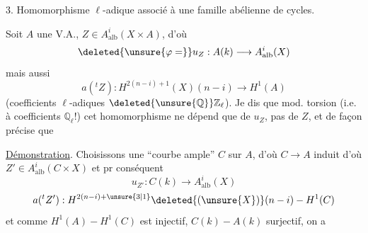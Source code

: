 3. Homomorphisme \(\ell\)-adique associé à une  famille abélienne de cycles.

Soit \(A\) une V.A., \(Z\in A^i_{\mathrm{alb}}(X\times A)\), d'où
\[
\deleted{\unsure{\varphi=}}u_Z:A(k)\longrightarrow A^i_{\mathrm{alb}}(X)
\]
mais aussi
\[
a({}^tZ):H^{2(n-i)+1}(X)(n-i)\longrightarrow H^1(A)
\]
(coefficients \(\ell\)-adiques \(\deleted{\unsure{\mathbb Q}}\mathbb Z_\ell\)). Je dis que mod. torsion (i.e. à coefficients \(\mathbb Q_\ell\)!) cet homomorphisme ne dépend que de \(u_Z\), pas de \(Z\),  et de façon précise que


\uline{Démonstration}. Choisissons une ``courbe ample'' \(C\) sur \(A\),  d'où \(C\longrightarrow A\) induit
d'où \(Z'\in A^i_{\mathrm{alb}}(C\times X)\) et pr conséquent
\[
u_{Z'}:C(k)\longrightarrow A^i_{\mathrm{alb}}(X)
\]
\[
a({}^tZ'):H^{2(n-i)+\unsure{3|1}}\deleted{(\unsure{X})}(n-i)\mathbin{-}H^1(C)
\]
et comme \(H^1(A)\mathbin{-}H^1(C)\) est injectif, \(C(k)\mathbin{-}A(k)\) surjectif, on a
